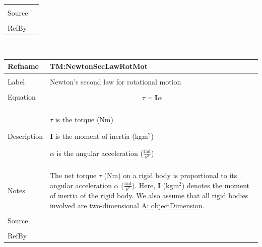 \documentclass[12pt]{article}
\begin{document}
\begin{minipage}{\textwidth}
\begin{tabular}{p{} p{}}
                                         \\ \midrule \\
                                         Source & \\ \midrule \\
                                                  RefBy & 
\\ \bottomrule \end{tabular}
\end{minipage}
\par~

\noindent \begin{minipage}{\textwidth}
\begin{tabular}{p{} p{}}
\toprule \textbf{Refname} & \textbf{TM:NewtonSecLawRotMot}
\label{TM:NewtonSecLawRotMot}
\\ \midrule \\
Label & Newton's second law for rotational motion
        \\ \midrule \\
        Equation & \begin{displaymath}
                   τ=\mathbf{I} α
                   \end{displaymath}
                   \\ \midrule \\
                   Description & \begin{symbDescription}
                                 \item{$τ$ is the torque (Nm)}
                                 \item{$\mathbf{I}$ is the moment of inertia (kg$\text{m}^{2}$)}
                                 \item{$α$ is the angular acceleration ($\frac{\text{rad}}{\text{s}^{2}}$)}
                                 \end{symbDescription}
                                 \\ \midrule \\
                                 Notes & The net torque $τ$ (Nm) on a rigid body is proportional to its angular acceleration $α$ ($\frac{\text{rad}}{\text{s}^{2}}$). Here, $\mathbf{I}$ (kg$\text{m}^{2}$) denotes the moment of inertia of the rigid body. We also assume that all rigid bodies involved are two-dimensional \hyperref[A:objectDimension]{A: objectDimension}.
                                         \\ \midrule \\
                                         Source & \\ \midrule \\
                                                  RefBy & 
\\ \bottomrule \end{tabular}
\end{minipage}
\end{document}
